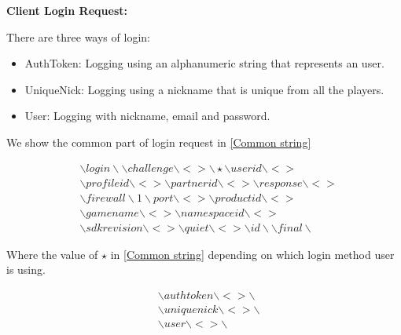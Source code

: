 \documentclass[oneside,titlepage,a4paper]{Definition/retrospy} %
\begin{document}
\begin{flushleft}
	\textbf{Client Login Request:\\}
\end{flushleft}
There are three ways of login:
\begin{itemize}
	\item AuthToken: Logging using an alphanumeric string that represents an user.
	\item 	UniqueNick: Logging using a nickname that is unique from all the players.
	\item User: Logging with nickname, email and password.
\end{itemize}
We show the common part of login request in \ref{Common string}
\begin{tcolorbox}
	\begin{equation}\label{Common string}
	\begin{split}
	&\backslash login \backslash \backslash challenge \backslash <  > \backslash \star
	\backslash userid \backslash <  > 
	\\& \backslash profileid \backslash <  > \backslash partnerid \backslash <  > \backslash response \backslash <  > 
	\\&
	\backslash firewall \backslash 1 \backslash port \backslash <  > \backslash productid \backslash  <  > 
	\\& \backslash gamename \backslash <  > \backslash namespaceid \backslash <  > 
	\\& \backslash  sdkrevision \backslash <  > \backslash quiet \backslash <  > \backslash id \backslash  \backslash final \backslash
	\end{split}
	\end{equation}
\end{tcolorbox}
Where the value of $ \star $ in \ref{Common string} depending on which login method user is using.
\begin{tcolorbox}
	\begin{equation}
		\begin{split}
		&\backslash authtoken \backslash <  > \backslash \\
		&\backslash uniquenick \backslash <  > \backslash\\
		&\backslash user \backslash <  > \backslash
		\end{split}
	\end{equation}
\end{tcolorbox}
\end{document}
